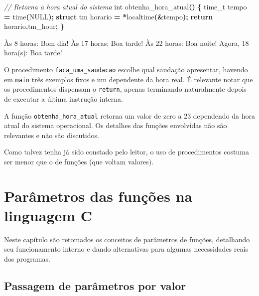 \documentclass[
  11pt,
  a4paper,
]{scrbook}
\newenvironment{Shaded}{\begin{snugshade}}{\end{snugshade}}
\newcommand{\CommentTok}[1]{\textcolor[rgb]{0.56,0.35,0.01}{\textit{#1}}}
\newcommand{\ControlFlowTok}[1]{\textcolor[rgb]{0.13,0.29,0.53}{\textbf{#1}}}
\newcommand{\DataTypeTok}[1]{\textcolor[rgb]{0.13,0.29,0.53}{#1}}
\newcommand{\KeywordTok}[1]{\textcolor[rgb]{0.13,0.29,0.53}{\textbf{#1}}}
\newcommand{\NormalTok}[1]{#1}
\newcommand{\OperatorTok}[1]{\textcolor[rgb]{0.81,0.36,0.00}{\textbf{#1}}}
\begin{document}
\begin{Shaded}
\begin{Highlighting}[]
\CommentTok{// Retorna a hora atual do sistema}
\DataTypeTok{int}\NormalTok{ obtenha\_hora\_atual}\OperatorTok{()} \OperatorTok{\{}
    \DataTypeTok{time\_t}\NormalTok{ tempo }\OperatorTok{=}\NormalTok{ time}\OperatorTok{(}\NormalTok{NULL}\OperatorTok{);}
    \KeywordTok{struct}\NormalTok{ tm horario }\OperatorTok{=} \OperatorTok{*}\NormalTok{localtime}\OperatorTok{(\&}\NormalTok{tempo}\OperatorTok{);}
    \ControlFlowTok{return}\NormalTok{ horario}\OperatorTok{.}\NormalTok{tm\_hour}\OperatorTok{;}
\OperatorTok{\}}
\end{Highlighting}
\end{Shaded}

\begin{Shaded}
\begin{Highlighting}[]
\NormalTok{Às 8 horas: Bom dia!}
\NormalTok{Às 17 horas: Boa tarde!}
\NormalTok{Às 22 horas: Boa noite!}
\NormalTok{Agora, 18 hora(s): Boa tarde!}
\end{Highlighting}
\end{Shaded}

O procedimento \texttt{faca\_uma\_saudacao} escolhe qual saudação
apresentar, havendo em \texttt{main} três exemplos fixos e um dependente
da hora real. É relevante notar que os procedimentos dispensam o
\texttt{return}, apenas terminando naturalmente depois de executar a
última instrução interna.

A função \texttt{obtenha\_hora\_atual} retorna um valor de zero a 23
dependendo da hora atual do sistema operacional. Os detalhes das funções
envolvidas não são relevantes e não são discutidos.

Como talvez tenha já sido constado pelo leitor, o uso de procedimentos
costuma ser menor que o de funções (que voltam valores).

\chapter{Parâmetros das funções na linguagem
C}\label{sec-parametros-de-funcoes}

Neste capítulo são retomados os conceitos de parâmetros de funções,
detalhando seu funcionamento interno e dando alternativas para algumas
necessidades reais dos programas.

\section{Passagem de parâmetros por
valor}\label{passagem-de-paruxe2metros-por-valor}
\end{document}
